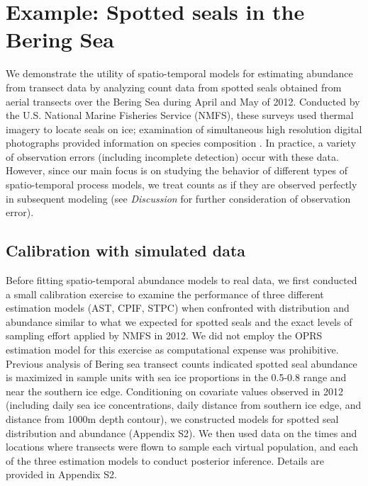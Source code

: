 \documentclass[times,mee,doublespace,]{besauth2}
\begin{document}
\section{Example: Spotted seals in the Bering Sea}

We demonstrate the utility of spatio-temporal models for estimating abundance from transect data by analyzing
count data from spotted seals obtained from aerial transects over the Bering Sea during April and May of 2012.  Conducted by the U.S. National Marine Fisheries Service (NMFS), these surveys used thermal imagery to locate seals on ice; examination of simultaneous high resolution digital photographs provided information on species composition \citep[for detailed information on survey methods, see][]{ConnEtAl2014}.  In practice, a variety of observation errors (including incomplete detection) occur with these data.  However, since our main focus is on studying the behavior of different types of spatio-temporal process models, we treat counts as if they are observed perfectly in subsequent modeling (see {\it Discussion} for further consideration of observation error).

\subsection{Calibration with simulated data}

Before fitting spatio-temporal abundance models to real data, we first conducted a small calibration exercise to examine the performance of three different estimation models (AST, CPIF, STPC) when confronted with distribution and abundance similar to what we expected for spotted seals and the exact levels of sampling effort applied by NMFS in 2012.  We did not employ the OPRS estimation model for this exercise as computational expense was prohibitive.  Previous analysis of Bering sea transect counts  \citep[e.g.]{ConnEtAl2014,VerHoefEtAl2014} indicated spotted seal abundance is maximized in sample units with sea ice proportions in the 0.5-0.8 range and near the southern ice edge.  Conditioning on covariate values observed in 2012 (including daily sea ice concentrations, daily distance from southern ice edge, and distance from 1000m depth contour), we constructed models for spotted seal distribution and abundance (Appendix S2).  We then used data on the times and locations where transects were flown to sample each virtual population, and each of the three estimation models to conduct posterior inference.  Details are provided in Appendix S2.
\end{document}
